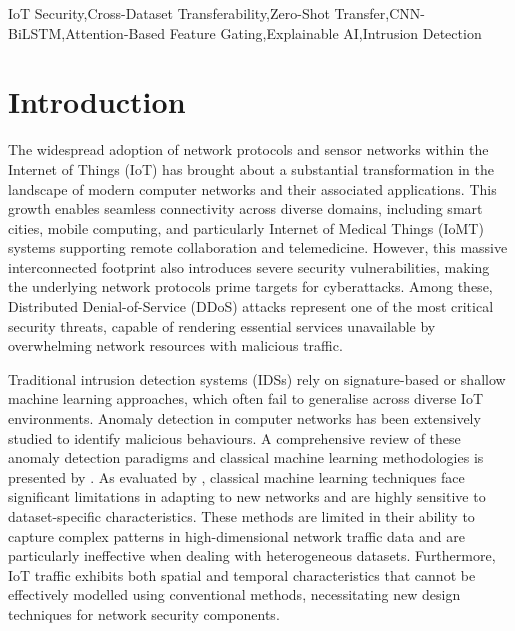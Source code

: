 \documentclass[a4paper,fleqn]{cas-sc}
\begin{document}


\begin{keywords}
{\color{blue}IoT Security\sep Cross-Dataset Transferability\sep Zero-Shot Transfer\sep CNN-BiLSTM\sep Attention-Based Feature Gating\sep Explainable AI\sep Intrusion Detection}
\end{keywords}

\maketitle

\section{Introduction}
\label{sec:intro}
The widespread adoption of network protocols and sensor networks within the Internet of Things (IoT) has brought about a substantial transformation in the landscape of modern computer networks and their associated applications. This growth enables seamless connectivity across diverse domains, including smart cities, mobile computing, and particularly Internet of Medical Things (IoMT) systems supporting remote collaboration and telemedicine. However, this massive interconnected footprint also introduces severe security vulnerabilities, making the underlying network protocols prime targets for cyberattacks. Among these, Distributed Denial-of-Service (DDoS) attacks represent one of the most critical security threats, capable of rendering essential services unavailable by overwhelming network resources with malicious traffic.

Traditional intrusion detection systems (IDSs) rely on signature-based or shallow machine learning approaches, which often fail to generalise across diverse IoT environments. Anomaly detection in computer networks has been extensively studied to identify malicious behaviours. A comprehensive review of these anomaly detection paradigms and classical machine learning methodologies is presented by \cite{AHMED201619}. As evaluated by \cite{sarhan2020evaluation}, classical machine learning techniques face significant limitations in adapting to new networks and are highly sensitive to dataset-specific characteristics. These methods are limited in their ability to capture complex patterns in high-dimensional network traffic data and are particularly ineffective when dealing with heterogeneous datasets. Furthermore, IoT traffic exhibits both spatial and temporal characteristics that cannot be effectively modelled using conventional methods, necessitating new design techniques for network security components.
\end{document}
